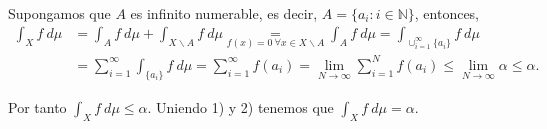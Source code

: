 \begin{ejemplo}
\begin{enumerate}
\begin{align*}
    \end{align*}
    Supongamos que $A$ es infinito numerable, es decir, $A = \{a_i : i \in \mathbb{N}\}$, entonces,
    \begin{align*}
        \int_{X}{f \ d\mu} &= \int_{A}{f \ d\mu} + \int_{X \backslash A}{f \ d\mu} \underset{f(x) = 0 \ \forall x \in X \backslash A}{=} \int_{A}{f \ d\mu} = \int_{\cup_{i=1}^{\infty}{\{a_i\}}}{{f \ d\mu}}\\
        &= \sum_{i=1}^{\infty}{\int_{\{a_i\}}{f \ d\mu}} = \sum_{i=1}^{\infty}{f(a_i)} = \lim_{N \to \infty}{\sum_{i=1}^{N}{f(a_i)}} \leq \lim_{N \to \infty}{\alpha} \leq \alpha.
    \end{align*}
\end{enumerate}
Por tanto $\int_{X}{f \ d\mu} \leq \alpha$. Uniendo 1) y 2) tenemos que $\int_{X}{f \ d\mu} = \alpha$.
\end{ejemplo}

